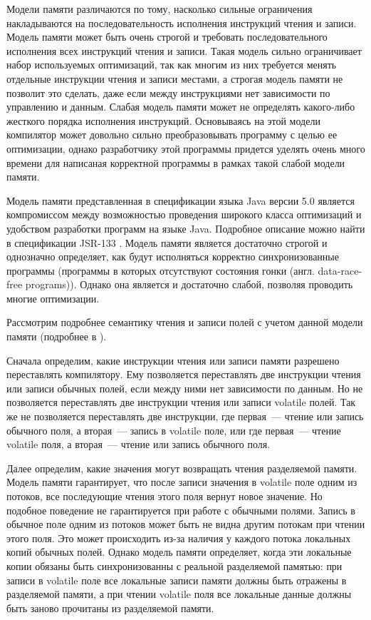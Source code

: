 \documentclass[14pt,titlepage]{extarticle}
\newcommand{\eng}[1]{{\English#1}}
\begin{document}
      Модели памяти различаются по тому, насколько сильные ограничения
      накладываются на последовательность исполнения инструкций чтения и
      записи.
      Модель памяти может быть очень строгой и требовать
      последовательного исполнения всех инструкций чтения и записи.
      Такая модель сильно ограничивает набор используемых оптимизаций,
      так как многим из них требуется менять отдельные инструкции чтения и
      записи местами, а строгая модель памяти не позволит это сделать, даже
      если между инструкциями нет зависимости по управлению и данным.
      Слабая модель памяти может не определять какого-либо жесткого порядка
      исполнения инструкций. Основываясь на этой модели компилятор может
      довольно сильно преобразовывать программу с целью ее оптимизации,
      однако разработчику этой программы придется уделять очень много времени
      для написаная корректной программы в рамках такой слабой модели памяти.

      Модель памяти представленная в спецификации языка Java версии 5.0 является
      компромиссом между возможностью проведения широкого класса оптимизаций и
      удобством разработки программ на языке Java. Подробное описание можно
      найти в спецификации JSR-133 \cite{jsr133}. Модель памяти является
      достаточно строгой и однозначно определяет, как будут исполняться
      корректно синхронизованные программы (программы в которых отсутствуют
      состояния гонки (англ. \eng{data-race-free programs})). Однако она
      является и достаточно слабой, позволяя проводить многие оптимизации.

      Рассмотрим подробнее семантику чтения и записи полей с учетом данной
      модели памяти (подробнее в \cite{jsr133_cookbook}).

      Сначала определим, какие инструкции чтения или записи памяти разрешено
      переставлять компилятору. Ему позволяется переставлять две инструкции
      чтения или записи обычных полей, если между ними нет зависимости по
      данным. Но не позволяется переставлять две инструкции чтения или записи
      \eng{volatile} полей. Так же не позволяется переставлять две инструкции,
      где первая~--- чтение или запись обычного поля, а вторая~--- запись в
      \eng{volatile} поле, или где первая~--- чтение \eng{volatile} поля, а
      вторая~--- чтение или запись обычного поля.

      Далее определим, какие значения могут возвращать чтения разделяемой
      памяти. Модель памяти гарантирует, что после записи значения в
      \eng{volatile} поле одним из потоков, все последующие чтения этого
      поля вернут новое значение. Но подобное поведение не гарантируется
      при работе с обычными полями. Запись в обычное поле одним из потоков
      может быть не видна другим потокам при чтении этого поля. Это может
      происходить из-за наличия у каждого потока локальных копий обычных полей.
      Однако модель памяти определяет, когда эти локальные копии обязаны быть
      синхронизованны с реальной разделяемой памятью: при записи в
      \eng{volatile} поле все локальные записи памяти должны быть отражены
      в разделяемой памяти, а при чтении \eng{volatile} поля все локальные
      данные должны быть заново прочитаны из разделяемой памяти.
\end{document}
